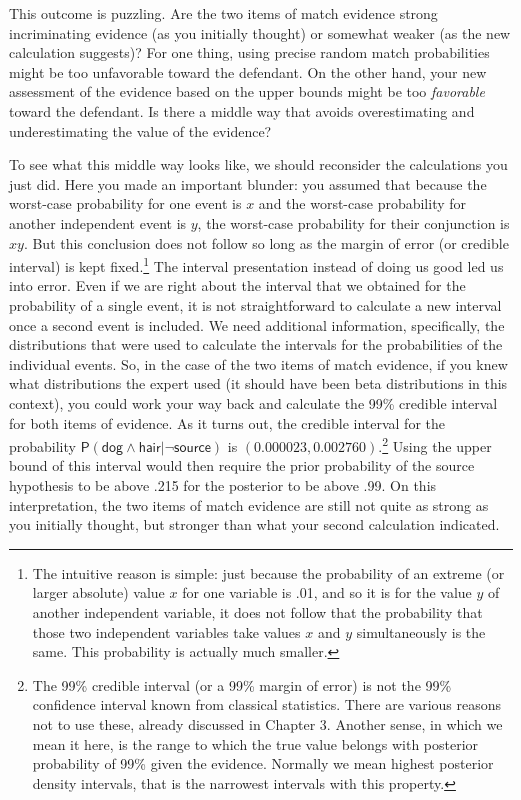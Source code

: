 \documentclass[
  10pt,
  dvipsnames,enabledeprecatedfontcommands]{scrartcl}
\newcommand{\s}[1]{\mbox{$\mathsf{#1}$}}
\begin{document}
This outcome is puzzling. Are the two items of match evidence strong
incriminating evidence (as you initially thought) or somewhat weaker (as
the new calculation suggests)? For one thing, using precise random match
probabilities might be too unfavorable toward the defendant. On the
other hand, your new assessment of the evidence based on the upper
bounds might be too \emph{favorable} toward the defendant. Is there a
middle way that avoids overestimating and underestimating the value of
the evidence?

To see what this middle way looks like, we should reconsider the
calculations you just did. Here you made an important blunder: you
assumed that because the worst-case probability for one event is \(x\)
and the worst-case probability for another independent event is \(y\),
the worst-case probability for their conjunction is \(xy\). But this
conclusion does not follow so long as the margin of error (or credible
interval) is kept fixed.\footnote{The intuitive reason is simple: just
  because the probability of an extreme (or larger absolute) value \(x\)
  for one variable is .01, and so it is for the value \(y\) of another
  independent variable, it does not follow that the probability that
  those two independent variables take values \(x\) and \(y\)
  simultaneously is the same. This probability is actually much smaller.}
The interval presentation instead of doing us good led us into error.
Even if we are right about the interval that we obtained for the
probability of a single event, it is not straightforward to calculate a
new interval once a second event is included. We need additional
information, specifically, the distributions that were used to calculate
the intervals for the probabilities of the individual events. So, in the
case of the two items of match evidence, if you knew what distributions
the expert used (it should have been beta distributions in this
context), you could work your way back and calculate the 99\% credible
interval for both items of evidence. As it turns out, the credible
interval for the probability
\(\mathsf{P}(\s{dog}\wedge \s{hair} \vert \neg \s{source})\) is
\((0.000023, 0.002760)\).\footnote{The 99\% credible interval (or a 99\%
  margin of error) is not the 99\% confidence interval known from
  classical statistics. There are various reasons not to use these,
  already discussed in Chapter 3. Another sense, in which we mean it
  here, is the range to which the true value belongs with posterior
  probability of 99\% given the evidence. Normally we mean highest
  posterior density intervals, that is the narrowest intervals with this
  property.} Using the upper bound of this interval would then require
the prior probability of the source hypothesis to be above .215 for the
posterior to be above .99. On this interpretation, the two items of
match evidence are still not quite as strong as you initially thought,
but stronger than what your second calculation indicated.
\end{document}
